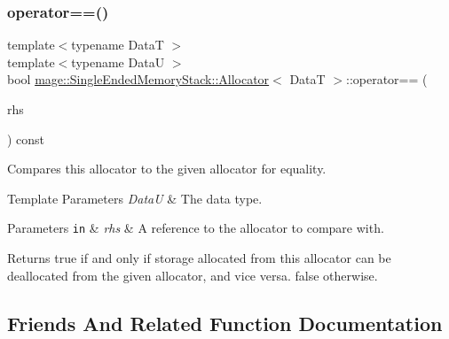 \subsubsection{\texorpdfstring{operator==()}{operator==()}}
{\footnotesize\ttfamily template$<$typename DataT $>$ \\
template$<$typename DataU $>$ \\
bool \hyperlink{structmage_1_1_single_ended_memory_stack_1_1_allocator}{mage\+::\+Single\+Ended\+Memory\+Stack\+::\+Allocator}$<$ DataT $>$\+::operator== (\begin{DoxyParamCaption}\item[{const \hyperlink{structmage_1_1_single_ended_memory_stack_1_1_allocator}{Allocator}$<$ DataU $>$ \&}]{rhs }\end{DoxyParamCaption}) const\hspace{0.3cm}{\ttfamily [noexcept]}}

Compares this allocator to the given allocator for equality.


\begin{DoxyTemplParams}{Template Parameters}
{\em DataU} & The data type. \\
\hline
\end{DoxyTemplParams}

\begin{DoxyParams}[1]{Parameters}
\mbox{\tt in}  & {\em rhs} & A reference to the allocator to compare with. \\
\hline
\end{DoxyParams}
\begin{DoxyReturn}{Returns}
{\ttfamily true} if and only if storage allocated from this allocator can be deallocated from the given allocator, and vice versa. {\ttfamily false} otherwise. 
\end{DoxyReturn}


\subsection{Friends And Related Function Documentation}
\hypertarget{structmage_1_1_single_ended_memory_stack_1_1_allocator_a3f3449e5c2caa1666a293b36db6f5a54}{}\label{structmage_1_1_single_ended_memory_stack_1_1_allocator_a3f3449e5c2caa1666a293b36db6f5a54} 
